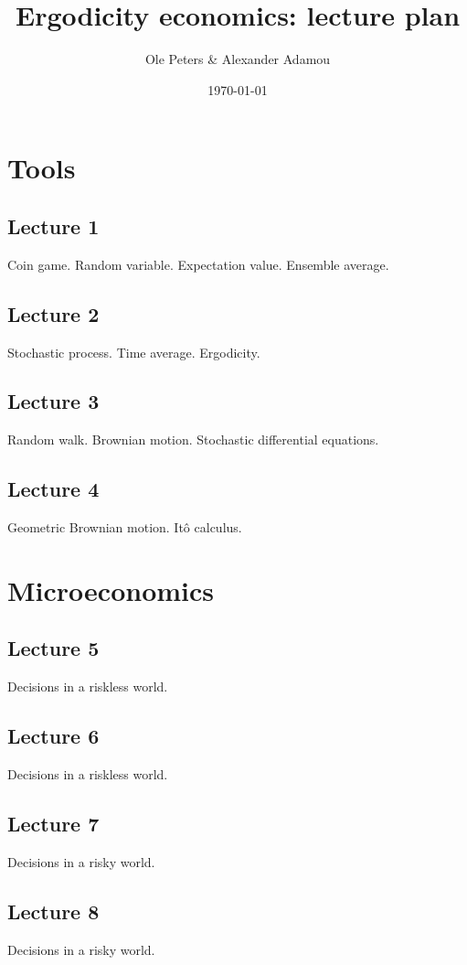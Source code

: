 \documentclass[12pt,a4paper]{article}
\begin{document}
\title{Ergodicity economics: lecture plan}
\author{Ole Peters \& Alexander Adamou}
\date{\today}
\maketitle

\section*{Tools}
\subsection*{Lecture 1}
Coin game. Random variable. Expectation value. Ensemble average.

\subsection*{Lecture 2}
Stochastic process. Time average. Ergodicity.

\subsection*{Lecture 3}
Random walk. Brownian motion. Stochastic differential equations.

\subsection*{Lecture 4}
Geometric Brownian motion. It\^{o} calculus.

\section*{Microeconomics}
\subsection*{Lecture 5}
Decisions in a riskless world.

\subsection*{Lecture 6}
Decisions in a riskless world.

\subsection*{Lecture 7}
Decisions in a risky world.

\subsection*{Lecture 8}
Decisions in a risky world.
\end{document}
